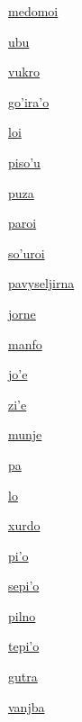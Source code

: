 {\hyperlink{val:medomoi}{medomoi}}{}{}{}

{\hyperlink{val:ubu}{ubu}}{}{}{}

{\hyperlink{val:vukro}{vukro}}{}{}{}

{\hyperlink{val:gohiraho}{go'ira'o}}{}{}{}

{\hyperlink{val:loi}{loi}}{}{}{}

{\hyperlink{val:pisohu}{piso'u}}{}{}{}

{\hyperlink{val:puza}{puza}}{}{}{}

{\hyperlink{val:paroi}{paroi}}{}{}{}

{\hyperlink{val:sohuroi}{so'uroi}}{}{}{}

{\hyperlink{val:pavyseljirna}{pavyseljirna}}{}{}{}

{\hyperlink{val:jorne}{jorne}}{}{}{}

{\hyperlink{val:manfo}{manfo}}{}{}{}

{\hyperlink{val:johe}{jo'e}}{}{}{}

{\hyperlink{val:zihe}{zi'e}}{}{}{}

{\hyperlink{val:munje}{munje}}{}{}{}

{\hyperlink{val:pa}{pa}}{}{}{}

{\hyperlink{val:lo}{lo}}{}{}{}

{\hyperlink{val:xurdo}{xurdo}}{}{}{}

{\hyperlink{val:piho}{pi'o}}{}{}{}

{\hyperlink{val:sepiho}{sepi'o}}{}{}{}

{\hyperlink{val:pilno}{pilno}}{}{}{}

{\hyperlink{val:tepiho}{tepi'o}}{}{}{}

{\hyperlink{val:gutra}{gutra}}{}{}{}

{\hyperlink{val:vanjba}{vanjba}}{}{}{}

